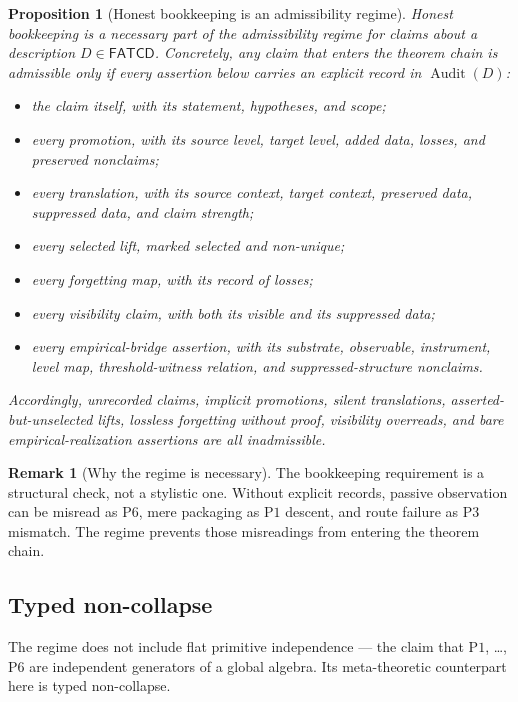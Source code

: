 \documentclass[11pt]{article}
\newtheorem{proposition}[theorem]{Proposition}
\theoremstyle{definition}
\newtheorem{remark}[theorem]{Remark}
\newcommand{\FATCD}{\ensuremath{\mathsf{FATCD}}}
\newcommand{\Audit}[1]{\ensuremath{\operatorname{Audit}\!\left(#1\right)}}
\newcommand{\Pone}{\ensuremath{\mathrm{P1}}}
\newcommand{\Pthree}{\ensuremath{\mathrm{P3}}}
\newcommand{\Psix}{\ensuremath{\mathrm{P6}}}
\begin{document}
\begin{proposition}[Honest bookkeeping is an admissibility regime]\label{prop:honest-bookkeeping}
Honest bookkeeping is a necessary part of the admissibility regime for
claims about a description \(D \in \FATCD{}\). Concretely, any claim that
enters the theorem chain is admissible only if every assertion below
carries an explicit record in \(\Audit{D}\):
\begin{itemize}[topsep=2pt,itemsep=1pt]
  \item the claim itself, with its statement, hypotheses, and scope;
  \item every promotion, with its source level, target level, added data,
    losses, and preserved nonclaims;
  \item every translation, with its source context, target context,
    preserved data, suppressed data, and claim strength;
  \item every selected lift, marked selected and non-unique;
  \item every forgetting map, with its record of losses;
  \item every visibility claim, with both its visible and its suppressed
    data;
  \item every empirical-bridge assertion, with its substrate, observable,
    instrument, level map, threshold-witness relation, and
    suppressed-structure nonclaims.
\end{itemize}
Accordingly, unrecorded claims, implicit promotions, silent translations,
asserted-but-unselected lifts, lossless forgetting without proof,
visibility overreads, and bare empirical-realization assertions are all
inadmissible.
\end{proposition}

\begin{remark}[Why the regime is necessary]\label{rem:why-honest-bookkeeping}
The bookkeeping requirement is a structural check, not a stylistic
one. Without explicit records, passive observation can be misread as
\Psix{}, mere packaging as \Pone{} descent, and route failure as
\Pthree{} mismatch. The regime prevents those misreadings from
entering the theorem chain.
\end{remark}


\subsection{Typed non-collapse}\label{subsec:typed-non-collapse}

The regime does not include flat primitive independence --- the claim
that \Pone{}, \ldots, \Psix{} are independent generators of a global
algebra. Its meta-theoretic counterpart here is typed non-collapse.
\end{document}
